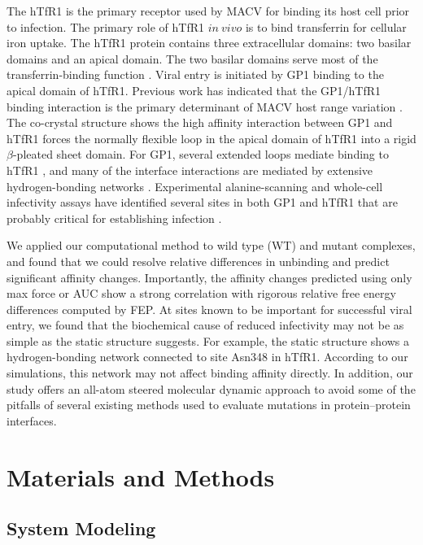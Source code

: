 \documentclass[12pt]{article}
\begin{document}
The hTfR1 is the primary receptor used by MACV for binding its host cell prior to infection. The primary role of hTfR1 $in~vivo$ is to bind transferrin for cellular iron uptake. The hTfR1 protein contains three extracellular domains: two basilar domains and an apical domain. The two basilar domains serve most of the transferrin-binding function \citep{Abraham2010,Rad20112}. Viral entry is initiated by GP1 binding to the apical domain of hTfR1. Previous work has indicated that the GP1/hTfR1 binding interaction is the primary determinant of MACV host range variation \citep{Rad20111,Rad20112}. The co-crystal structure shows the high affinity interaction between GP1 and hTfR1 forces the normally flexible loop in the apical domain of hTfR1 into a rigid $\beta$-pleated sheet domain. For GP1, several extended loops mediate binding to hTfR1 \citep{Abraham2010,Rad20112}, and many of the interface interactions are mediated by extensive hydrogen-bonding networks \citep{Abraham2010}. Experimental alanine-scanning and whole-cell infectivity assays have identified several sites in both GP1 and hTfR1 that are probably critical for establishing infection \citep{Rad20111,Rad20112}.

We applied our computational method to wild type (WT) and mutant complexes, and found that we could resolve relative differences in unbinding and predict significant affinity changes. Importantly, the affinity changes predicted using only max force or AUC show a strong correlation with rigorous relative free energy differences computed by FEP. At sites known to be important for successful viral entry, we found that the biochemical cause of reduced infectivity may not be as simple as the static structure suggests. For example, the static structure shows a hydrogen-bonding network connected to site Asn348 in hTfR1. According to our simulations, this network may not affect binding affinity directly. In addition, our study offers an all-atom steered molecular dynamic approach to avoid some of the pitfalls of several existing methods used to evaluate mutations in protein--protein interfaces.

\section{Materials and Methods}

\subsection{System Modeling}
\end{document}
